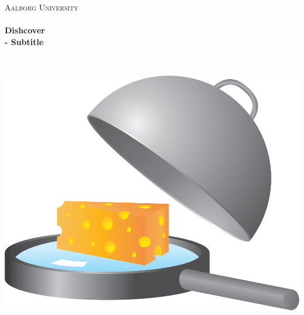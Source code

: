 \begin{titlingpage}\centering

\textsc{\LARGE Aalborg University}\\[0.3cm]

\HRule \\[0.4cm]
{\huge \bfseries Dishcover}\\[0.5cm]
{\Large \bfseries - Subtitle}

\HRule \\[2cm]

\begin{minipage}{\columnwidth}
\centering
\includegraphics[width=0.85\linewidth]{img/dishcover.png}
\end{minipage}


\end{titlingpage}
